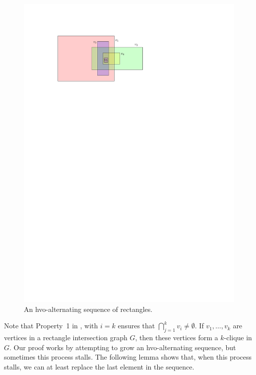 \documentclass[lotsofwhite]{patmorin}
\begin{document}
\begin{figure}
  \begin{center}
    \includegraphics{figs/good-sequence}
  \end{center}
  \caption{An hvo-alternating sequence of rectangles.}
\end{figure}

Note that Property~1 in , with $i=k$ ensures that
$\bigcap_{j=1}^k v_i\neq\emptyset$.  If $v_1,\ldots,v_k$ are vertices in a
rectangle intersection graph $G$, then these vertices form a $k$-clique
in $G$.  Our proof works by attempting to grow an hvo-alternating
sequence, but sometimes this process stalls. The following lemma shows
that, when this process stalls, we can at least replace the last element
in the sequence.
\end{document}
